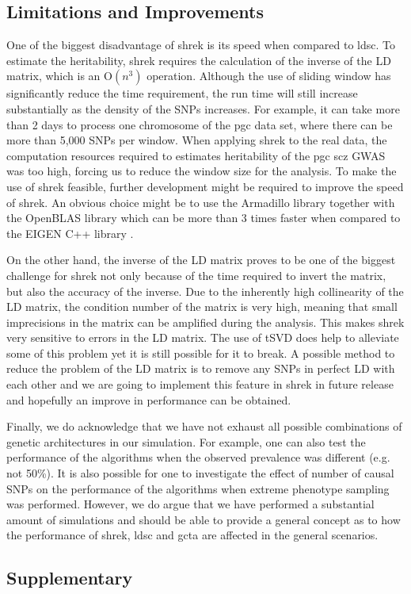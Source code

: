 	
	\subsection{Limitations and Improvements}
	One of the biggest disadvantage of \gls{shrek} is its speed when compared to \gls{ldsc}. 
	To estimate the heritability, \gls{shrek} requires the calculation of the inverse of the \gls{LD} matrix, which is an $\mathrm{O}(n^3)$ operation. 
	Although the use of sliding window has significantly reduce the time requirement, the run time will still increase substantially as the density of the \glspl{SNP} increases. 
	For example, it can take more than 2 days to process one chromosome of the \gls{pgc}  data set, where there can be more than 5,000 \glspl{SNP} per window.
	When applying \gls{shrek} to the real data, the computation resources required to estimates heritability of the \gls{pgc} \gls{scz} \gls{GWAS} was too high, forcing us to reduce the window size for the analysis. 
	To make the use of \gls{shrek} feasible, further development might be required to improve the speed of \gls{shrek}.
	An obvious choice might be to use the Armadillo library \citep{Sanderson2010} together with the OpenBLAS library which can be more than 3 times faster when compared to the EIGEN C++ library \citep{Ho2011}.
	
	On the other hand, the inverse of the \gls{LD} matrix proves to be one of the biggest challenge for \gls{shrek} not only because of the time required to invert the matrix, but also the accuracy of the inverse.
	Due to the inherently high collinearity of the \gls{LD} matrix, the condition number of the matrix is very high, meaning that small imprecisions in the matrix can be amplified during the analysis. 
	This makes \gls{shrek} very sensitive to errors in the \gls{LD} matrix. 
	The use of \gls{tSVD} does help to alleviate some of this problem yet it is still possible for it to break.
	A possible method to reduce the problem of the \gls{LD} matrix is to remove any \glspl{SNP} in perfect \gls{LD} with each other and we are going to implement this feature in \gls{shrek} in future release and hopefully an improve in performance can be obtained.  
	
	Finally, we do acknowledge that we have not exhaust all possible combinations of genetic architectures in our simulation.
	For example, one can also test the performance of the algorithms when the observed prevalence was different (e.g. not 50\%).
	It is also possible for one to investigate the effect of number of causal \glspl{SNP} on the performance of the algorithms when extreme phenotype sampling was performed.
	However, we do argue that we have performed a substantial amount of simulations and should be able to provide a general concept as to how the performance of \gls{shrek}, \gls{ldsc} and \gls{gcta} are affected in the general scenarios.
	
	\newpage
	
\begin{singlespace}
\section{Supplementary}



\end{singlespace}
	